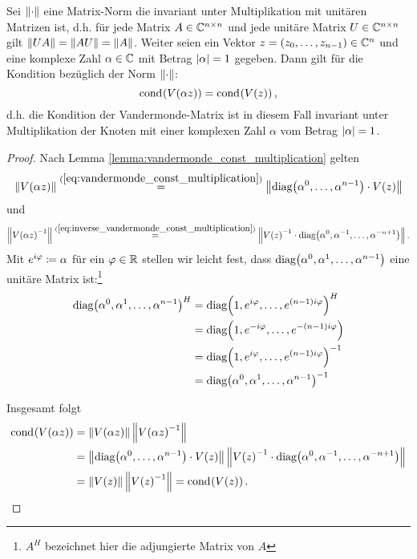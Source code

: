 \begin{lemma}
    Sei $\left\lVert \cdot \right\rVert$ eine Matrix-Norm die invariant unter Multiplikation mit unitären
    Matrizen ist, d.h. für jede Matrix $A \in \mathbb{C}^{n\times n}$ und jede
    unitäre Matrix $U \in \mathbb{C}^{n\times n}$ gilt $\left\lVert UA \right\rVert = \left\lVert AU \right\rVert = \left\lVert A \right\rVert$.
    Weiter seien ein Vektor $z = (z_0, \dots, z_{n-1}) \in \mathbb{C}^n$ und eine
    komplexe Zahl $\alpha \in \mathbb{C}$ mit Betrag $\left\lvert \alpha \right\rvert = 1$ gegeben.
    Dann gilt für die Kondition bezüglich der Norm $\left\lVert \cdot \right\rVert$:
    \[
        \text{cond}_{{}}\! \left( V \! \left( \alpha z \right) \right) = \text{cond}_{{}}\! \left( V \! \left( z \right) \right),
    \]
    d.h. die Kondition der Vandermonde-Matrix ist in diesem Fall invariant
    unter Multiplikation der Knoten mit einer komplexen Zahl $\alpha$ vom
    Betrag $\left\lvert \alpha \right\rvert = 1$.
\end{lemma}
\begin{proof}
    Nach Lemma \ref{lemma:vandermonde_const_multiplication} gelten
    \[
        \left\lVert  V \! \left( \alpha z \right)  \right\rVert
        \overset{(\ref{eq:vandermonde_const_multiplication})}{=}
            \left\lVert \text{diag$ \left( \alpha^0, \dots, \alpha^{n-1} \right)$} \cdot V \! \left( z \right) \right\rVert
    \]
    und
    \[
        \left\lVert  V \! \left( \alpha z \right)^{-1}  \right\rVert
        \overset{(\ref{eq:inverse_vandermonde_const_multiplication})}{=}
            \left\lVert V \! \left( z \right)^{-1} \cdot \text{diag$ \left( \alpha^0, \alpha^{-1}, \dots, \alpha^{-n+1} \right)$} \right\rVert.
    \]
    Mit $e^{i \varphi} \coloneqq \alpha$ für ein $\varphi \in \mathbb{R}$ stellen wir
    leicht fest, dass
    $\text{diag$ \left( \alpha^0, \alpha^1, \dots, \alpha^{n-1} \right)$}$ eine unitäre Matrix ist:\footnote{$A^H$ bezeichnet hier die adjungierte Matrix von $A$}
    \[
        \begin{split}
            \text{diag$ \left( \alpha^0, \alpha^1, \dots, \alpha^{n-1} \right)$}^H
            &= \text{diag$ \left( 1, e^{i \varphi}, \dots, e^{(n-1) i \varphi} \right)$}^H\\
            &= \text{diag$ \left( 1, e^{-i \varphi}, \dots, e^{-(n-1) i \varphi} \right)$}\\
            &= \text{diag$ \left( 1, e^{i \varphi}, \dots, e^{(n-1) i \varphi} \right)$}^{-1}\\
            &= \text{diag$ \left( \alpha^0, \alpha^1, \dots, \alpha^{n-1} \right)$}^{-1}
        \end{split}
    \]

\enlargethispage{3em}
    \noindent Insgesamt folgt
    \[
        \begin{split}
            \cond{\Vand{\alpha z}}
            &= \norm{\Vand{\alpha z}} \norm{\Vand{\alpha z}^{-1}}\\
            &= \norm{\diag{\alpha^0, \dots, \alpha^{n-1}} \cdot \Vand{z}} \norm{\Vand{z}^{-1} \cdot \diag{\alpha^0, \alpha^{-1}, \dots, \alpha^{-n+1}}}\\
            &= \norm{\Vand{z}} \norm{\Vand{z}^{-1}}
            = \cond{\Vand{z}}.
        \end{split}
    \]
\end{proof}

